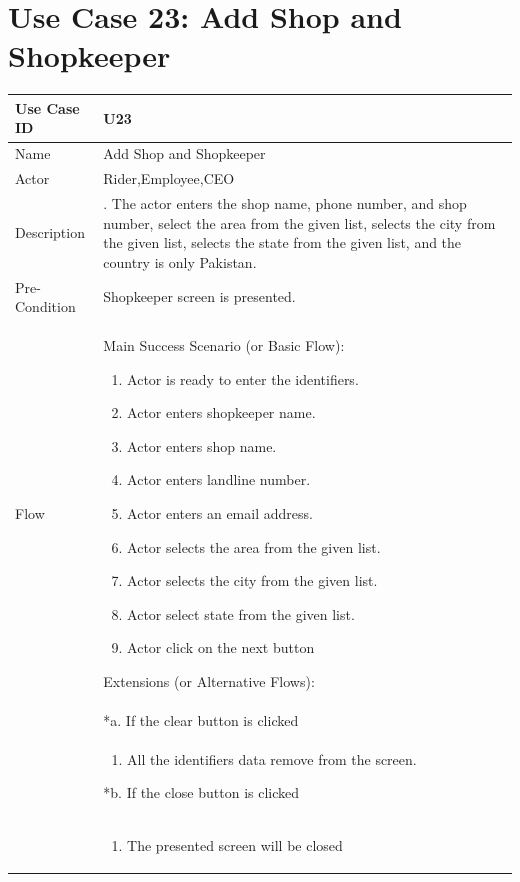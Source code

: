 \documentclass[12pt,a4paper]{report}
\begin{document}
\section{Use Case 23: Add Shop and Shopkeeper}
\begin{tabular}{ | m{3cm} | m{12cm}| } \hline
Use Case ID & U23   \\\hline
Name  &  Add Shop and Shopkeeper \\ \hline
Actor &   Rider,Employee,CEO\\ \hline
Description &. The actor enters the shop name, phone number, and shop number, select the area from the given list, selects the city from the given list, selects the state from the given list, and the country is only Pakistan. \\ \hline
Pre-Condition & Shopkeeper screen is presented.  \\\hline
Flow & Main Success Scenario (or Basic Flow):
\begin{enumerate}
\item Actor is ready to enter the identifiers.
\item Actor enters shopkeeper name.   
\item Actor enters shop name.   
\item Actor enters landline number.
\item Actor enters an email address.
\item Actor selects the area from the given list.
\item Actor selects the city from the given list.
\item Actor select state from the given list.
\item  Actor click on the next button
\end{enumerate}
Extensions (or Alternative Flows):\\
& *a. If the clear button is clicked \\
& \begin{enumerate}
		\item All the identifiers data remove from the screen.
	\end{enumerate}
*b. If the close button is clicked\\
&	\begin{enumerate}
		\item The presented screen will be closed
	\end{enumerate}
\\\hline
\end{tabular}
\end{document}
